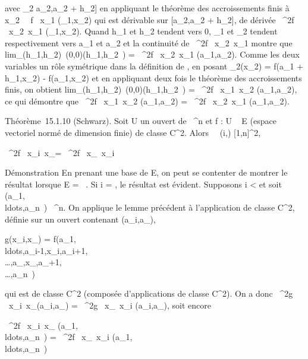 \documentclass[]{article}
\begin{document}
avec \xi\_2 \in {[}a\_2,a\_2 + h\_2{]} en
appliquant le théorème des accroissements finis à
x\_2\mapsto~ \partial~f \over
\partial~x\_1 (\xi\_1,x\_2) qui est dérivable sur
{[}a\_2,a\_2 + h\_2{]}, de dérivée 
\partial~^2f \over \partial~x\_2\partial~x\_1
(\xi\_1,x\_2). Quand h\_1 et h\_2 tendent
vers 0, \xi\_1 et \xi\_2 tendent respectivement vers
a\_1 et a\_2 et la continuité de  \partial~^2f
\over \partial~x\_2\partial~x\_1 montre que
lim\_(h\_1,h\_2)\rightarrow~(0,0)\phi(h\_1,h\_2~)
= \partial~^2f \over \partial~x\_2\partial~x\_1
(a\_1,a\_2). Comme les deux variables \jmathouent un rôle
symétrique dans la définition de \phi, en posant \psi\_2(x\_2)
= f(a\_1 + h\_1,x\_2) -
f(a\_1,x\_2) et en appliquant deux fois le théorème des
accroissements finis, on obtient
lim\_(h\_1,h\_2)\rightarrow~(0,0)\phi(h\_1,h\_2~)
= \partial~^2f \over \partial~x\_1\partial~x\_2
(a\_1,a\_2), ce qui démontre que  \partial~^2f
\over \partial~x\_1\partial~x\_2
(a\_1,a\_2) = \partial~^2f \over
\partial~x\_2\partial~x\_1 (a\_1,a\_2).

Théorème~15.1.10 (Schwarz). Soit U un ouvert de ~^n et f : U
\rightarrow~ E (espace vectoriel normé de dimension finie) de classe
C^2. Alors \forall~~(i,\jmath) \in
{[}1,n{]}^2,

 \partial~^2f \over \partial~x\_i\partial~x\_\jmath =
\partial~^2f \over \partial~x\_\jmath\partial~x\_i

Démonstration En prenant une base de E, on peut se contenter de montrer
le résultat lorsque E = ~. Si i = \jmath, le résultat est évident. Supposons
i \textless{} \jmath et soit
(a\_1,\\ldots,a\_n~)
\in {}~^n. On applique le lemme précédent à l'application de
classe C^2, définie sur un ouvert contenant
(a\_i,a\_\jmath),

g(x\_i,x\_\jmath) =
f(a\_1,\\ldots,a\_i-1,x\_i,a\_i+1,\\\ldots,a\_,x\_\jmath,a\_\jmath+1,\\\ldots,a\_n~)

qui est de classe C^2 (composée d'applications de classe
C^2). On a donc  \partial~^2g \over
\partial~x\_i\partial~x\_\jmath (a\_i,a\_\jmath) =
\partial~^2g \over \partial~x\_\jmath\partial~x\_i
(a\_i,a\_\jmath), soit encore

 \partial~^2f \over \partial~x\_i\partial~x\_\jmath
(a\_1,\\ldots,a\_n~)
= \partial~^2f \over \partial~x\_\jmath\partial~x\_i
(a\_1,\\ldots,a\_n~)
\end{document}
